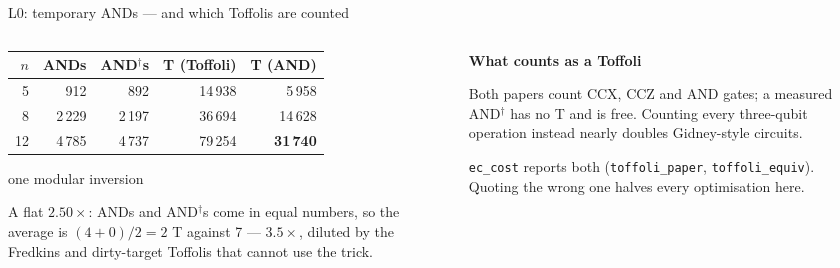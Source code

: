 \documentclass[aspectratio=169,11pt]{beamer}
\newcommand{\blocktitle}[1]{{\bfseries #1}\par\vskip1mm}
\begin{document}
\setcounter{framenumber}{79}
\begin{frame}{L0: temporary ANDs --- and which Toffolis are counted}
  \begin{columns}[T]
    \begin{column}{0.52\textwidth}
      \centering\footnotesize
      \renewcommand{\arraystretch}{1.12}
      \begin{tabular}{@{}rrrrr@{}}
        \toprule
        $n$ & ANDs & AND$^\dagger$s & T (Toffoli) & T (AND) \\
        \midrule
        5 & 912 & 892 & 14\,938 & 5\,958 \\
        8 & 2\,229 & 2\,197 & 36\,694 & 14\,628 \\
        12 & 4\,785 & 4\,737 & 79\,254 & \textbf{31\,740} \\
        \bottomrule
      \end{tabular}\par
      {\scriptsize one modular inversion}\par
      \vskip2mm
      \raggedright\small
      A flat $2.50\times$: ANDs and AND$^\dagger$s come in equal numbers, so the average is $(4+0)/2=2$ T against 7 --- $3.5\times$, diluted by the Fredkins and dirty-target Toffolis that cannot use the trick.
    \end{column}
    \begin{column}{0.44\textwidth}
      \begin{greyblock}[fontupper=\small]
        \blocktitle{What counts as a Toffoli}
        Both papers count CCX, CCZ and AND gates; a measured AND$^\dagger$ has no T and is free. Counting every three-qubit operation instead nearly doubles Gidney-style circuits.\par\vskip1mm
        \texttt{ec\_cost} reports both (\texttt{toffoli\_paper}, \texttt{toffoli\_equiv}). Quoting the wrong one halves every optimisation here.
      \end{greyblock}
    \end{column}
  \end{columns}
\end{frame}
\end{document}
